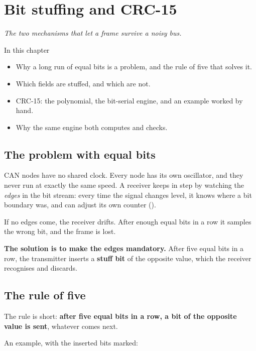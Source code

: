 \chapter{Bit stuffing and CRC-15}
\label{ch:stuffing}

{\large\itshape The two mechanisms that let a frame survive a noisy bus.\par}

\begin{chapterbox}{In this chapter}
\begin{itemize}
  \item Why a long run of equal bits is a problem, and the rule of five that solves it.
  \item Which fields are stuffed, and which are not.
  \item CRC-15: the polynomial, the bit-serial engine, and an example worked by hand.
  \item Why the same engine both computes and checks.
\end{itemize}
\end{chapterbox}

\section{The problem with equal bits}

CAN nodes have no shared clock. Every node has its own oscillator, and they never run at exactly
the same speed. A receiver keeps in step by watching the \emph{edges} in the bit stream: every time
the signal changes level, it knows where a bit boundary was, and can adjust its own counter
().

If no edges come, the receiver drifts. After enough equal bits in a row it samples the wrong bit,
and the frame is lost.

\textbf{The solution is to make the edges mandatory.} After five equal bits in a row, the
transmitter inserts a \textbf{stuff bit} of the opposite value, which the receiver recognises and
discards.

\section{The rule of five}

The rule is short: \textbf{after five equal bits in a row, a bit of the opposite value is sent},
whatever comes next.

An example, with the inserted bits marked:

